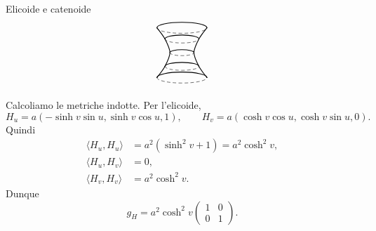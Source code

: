 \documentclass[a4paper]{article}
\begin{document}
\begin{snippetexample}{Elicoide e catenoide}
\[\begin{tikzpicture}[scale=0.9, line cap=round, line join=round, >=stealth]
\begin{scope}[shift={(5.4,0)}]
        \draw[thick] plot[smooth] coordinates {
            (-1.00,-1.00)
            (-0.68,-0.55)
            (-0.48, 0.00)
            (-0.68, 0.55)
            (-1.00, 1.00)
        };

        \draw[thick] plot[smooth] coordinates {
            ( 1.00,-1.00)
            ( 0.68,-0.55)
            ( 0.48, 0.00)
            ( 0.68, 0.55)
            ( 1.00, 1.00)
        };

        \draw[dashed]
            (-1.00,-1.00) arc[start angle=180,end angle=360,x radius=1.00,y radius=0.22];
        \draw[thick]
            ( 1.00,-1.00) arc[start angle=0,end angle=180,x radius=1.00,y radius=0.22];

        \draw[dashed]
            (-0.68,-0.55) arc[start angle=180,end angle=360,x radius=0.68,y radius=0.16];
        \draw[thick]
            ( 0.68,-0.55) arc[start angle=0,end angle=180,x radius=0.68,y radius=0.16];

        \draw[dashed]
            (-0.48,0.00) arc[start angle=180,end angle=360,x radius=0.48,y radius=0.12];
        \draw[thick]
            ( 0.48,0.00) arc[start angle=0,end angle=180,x radius=0.48,y radius=0.12];

        \draw[dashed]
            (-0.68,0.55) arc[start angle=180,end angle=360,x radius=0.68,y radius=0.16];
        \draw[thick]
            ( 0.68,0.55) arc[start angle=0,end angle=180,x radius=0.68,y radius=0.16];

        \draw[dashed]
            (-1.00,1.00) arc[start angle=180,end angle=360,x radius=1.00,y radius=0.22];
        \draw[thick]
            ( 1.00,1.00) arc[start angle=0,end angle=180,x radius=1.00,y radius=0.22];
    \end{scope}

\end{tikzpicture}
\]

Calcoliamo le metriche indotte. Per l'elicoide,
\[
    H_u
    =
    a(-\sinh v\sin u,\sinh v\cos u,1),
    \qquad
    H_v
    =
    a(\cosh v\cos u,\cosh v\sin u,0).
\]
Quindi
\begin{align*}
    \langle H_u,H_u\rangle
    &=
    a^2(\sinh^2 v+1)
    =
    a^2\cosh^2 v,\\
    \langle H_u,H_v\rangle
    &=0,\\
    \langle H_v,H_v\rangle
    &=
    a^2\cosh^2 v.
\end{align*}
Dunque
\[
    g_H
    =
    a^2\cosh^2 v
    \begin{pmatrix}
        1 & 0\\
        0 & 1
    \end{pmatrix}.
\]


\end{snippetexample}
\end{document}
